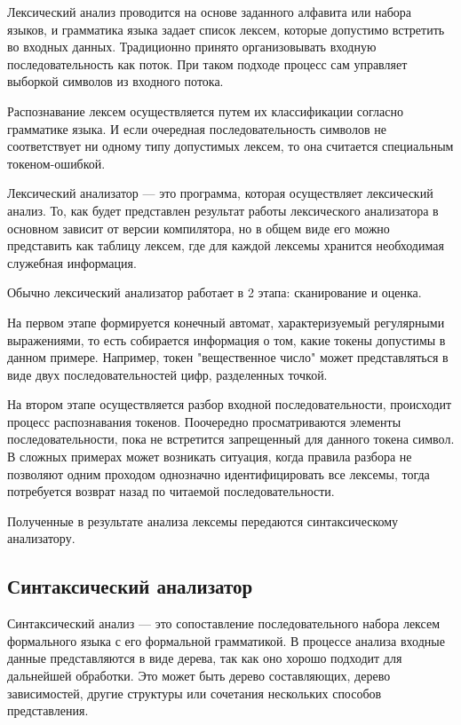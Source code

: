 \documentclass[bachelor, och, coursework, times]{SCWorks}
\begin{document}
Лексический анализ проводится на основе заданного алфавита или набора языков, и грамматика языка задает список лексем, которые допустимо встретить во входных данных.
Традиционно принято организовывать входную последовательность как поток. При таком подходе процесс сам управляет выборкой символов из входного потока.

Распознавание лексем осуществляется путем их классификации согласно грамматике языка. 
И если очередная последовательность символов не соответствует ни одному типу допустимых лексем, то она считается специальным токеном-ошибкой.

Лексический анализатор --- это программа, которая осуществляет лексический анализ.
То, как будет представлен результат работы лексического анализатора в основном зависит от версии компилятора, но в общем виде его можно представить как таблицу лексем, где для каждой лексемы хранится необходимая служебная информация.

Обычно лексический анализатор работает в 2 этапа: сканирование и оценка.

На первом этапе формируется конечный автомат, характеризуемый регулярными выражениями, то есть собирается информация о том, какие токены допустимы в данном примере. Например, токен "вещественное число" может представляться в виде двух последовательностей цифр, разделенных точкой.

На втором этапе осуществляется разбор входной последовательности, происходит процесс распознавания токенов. Поочередно просматриваются элементы последовательности, пока не встретится запрещенный для данного токена символ. В сложных примерах может возникать ситуация, когда правила разбора не позволяют одним проходом однозначно идентифицировать все лексемы, тогда потребуется возврат назад по читаемой последовательности.

Полученные в результате анализа лексемы передаются синтаксическому анализатору.~\cite{Compilers}

\subsection{Синтаксический анализатор}

Синтаксический анализ --- это сопоставление последовательного набора лексем формального языка с его формальной грамматикой.
В процессе анализа входные данные представляются в виде дерева, так как оно хорошо подходит для дальнейшей обработки. Это может быть дерево составляющих, дерево зависимостей, другие структуры или сочетания нескольких способов представления.
\end{document}
